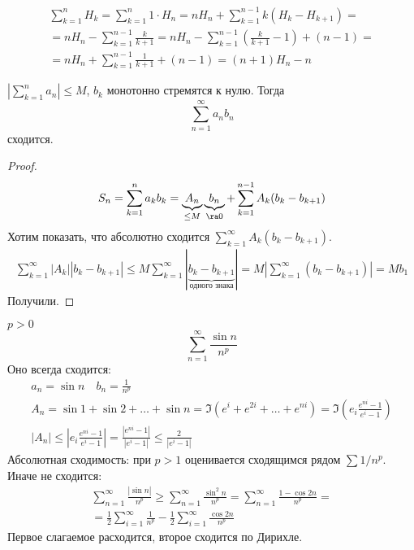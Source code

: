 \begin{exmp}
	\begin{gather*}
		\sum_{k=1}^n H_k = \sum_{k=1}^n 1 \cdot H_n = n H_n + \sum_{k=1}^{n-1} k(H_k - H_{k+1}) = \\
		= n H_n - \sum_{k=1}^{n-1} \frac{k}{k+1} = n H_n - \sum_{k=1}^{n-1} \left(\frac{k}{k+1} - 1\right) + (n - 1) = \\
		= n H_n + \sum_{k=1}^{n-1} \frac1{k+1} + (n-1) = (n+1) H_n - n
	\end{gather*}
\end{exmp}

\begin{theorem}
	$\left| \sum_{k=1}^n a_n \right| \le M$, $b_k$ монотонно стремятся к нулю.
	Тогда
	\[ \sum_{n=1}^\infty a_n b_n \]
	сходится.
\end{theorem}
\begin{proof}
	\begin{gather*}
		S_n = \sum_{k=1}^n a_kb_k = \underbrace{A_n}_{\le M}\underbrace{b_n}_{\ra 0} + \sum_{k=1}^{n-1} A_k(b_k - b_{k+1})
	\end{gather*}
	Хотим показать, что абсолютно сходится $\sum_{k=1}^\infty A_k(b_k - b_{k+1})$.
	\begin{gather*}
		\sum_{k=1}^\infty |A_k||b_k - b_{k+1}|
		\le M \sum_{k=1}^\infty |\underbrace{b_k - b_{k+1}}_{\text{одного знака}}|
		= M|\sum_{k=1}^\infty (b_k - b_{k+1})|
		= Mb_1
	\end{gather*}
	Получили.
\end{proof}

\begin{exmp}
	$p > 0$
	\[ \sum_{n=1}^\infty \frac{\sin n}{n^p} \]
	Оно всегда сходится:
	\begin{gather*}
		a_n = \sin n \quad b_n = \frac1{n^p} \\
		A_n = \sin 1 + \sin 2 + \dots + \sin n = \Im (e^i + e^{2i} + \dots + e^{ni}) = \Im \left( e_i \frac{e^{ni} - 1}{e^i - 1} \right) \\
		|A_n|  \le \left| e_i \frac{e^{ni} - 1}{e^i - 1} \right| = \frac{|e^{ni} - 1|}{|e^i - 1|} \le \frac2{|e^i - 1|}
	\end{gather*}
	Абсолютная сходимость: при $p > 1$ оценивается сходящимся рядом $\sum 1/n^p$. Иначе не сходится:
	\begin{gather*}
		\sum_{n=1}^\infty \frac{|\sin n|}{n^p} \ge \sum_{n=1}^\infty \frac{\sin^2 n}{n^p} = \sum_{n=1}^\infty \frac{1 - \cos 2n}{n^p} = \\
		= \frac12 \sum_{i=1}^\infty \frac1{n^p} - \frac12 \sum_{i=1}^\infty \frac{\cos 2n}{n^p}
	\end{gather*}
	Первое слагаемое расходится, второе сходится по Дирихле.
\end{exmp}


